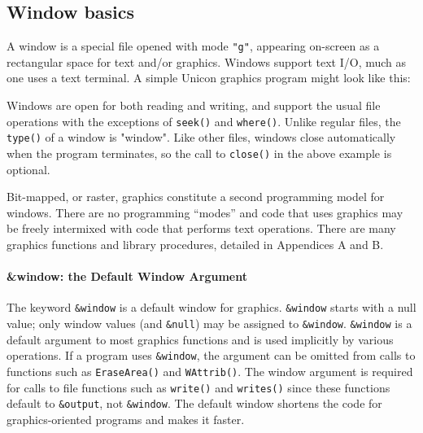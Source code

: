 \subsection{Window basics}

A window is a special file opened with mode \texttt{"g"}, appearing
on-screen as a rectangular space for text and/or graphics. Windows
support text I/O, much as one uses a text terminal. A simple Unicon
graphics program might look like this:


Windows are open for both reading and writing, and support the usual
file operations with the exceptions of \texttt{seek()} and
\texttt{where()}. Unlike regular files, the \texttt{type()} of a
window is "window". Like other files, windows close automatically when
the program terminates, so the call to \texttt{close()} in the above
example is optional.

Bit-mapped, or raster, graphics constitute a second programming model
for windows. There are no programming ``modes'' and code that uses
graphics may be freely intermixed with code that performs text
operations. There are many graphics functions and library procedures,
detailed in Appendices A and B.

\paragraph{\&window: the Default Window Argument}

The keyword \texttt{\&window} is a default window for graphics.
\texttt{\&window} starts with a null value; only window values (and
\texttt{\&null}) may be assigned to
\texttt{\&window}. \texttt{\&window} is a default argument to most
graphics functions and is used implicitly by various operations. If a
program uses \texttt{\&window}, the argument can be omitted from calls
to functions such as \texttt{EraseArea()} and \texttt{WAttrib()}. The
window argument is required for calls to file functions such as
\texttt{write()} and \texttt{writes()} since these functions default
to \texttt{\&output}, not \texttt{\&window}. The default window
shortens the code for graphics-oriented programs and makes it faster.

